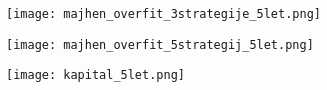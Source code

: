 \documentclass{beamer}
\begin{document}


\begin{frame}
\texttt{[image: majhen\_overfit\_3strategije\_5let.png]}
\end{frame}

\begin{frame}
\texttt{[image: majhen\_overfit\_5strategij\_5let.png]}
\end{frame}



\begin{frame}
\texttt{[image: kapital\_5let.png]}
\end{frame}

\end{document}
